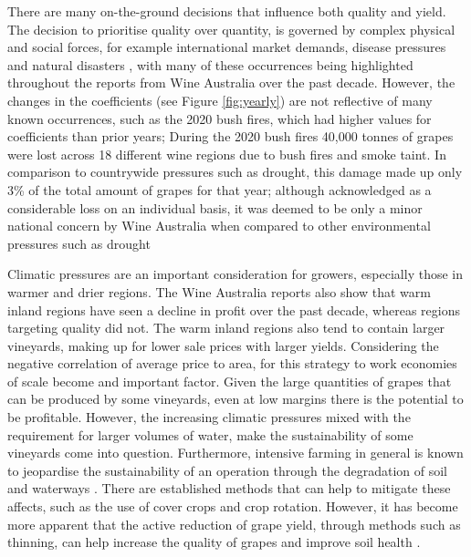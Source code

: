 \documentclass[review,12pt,authoryear]{elsarticle}
\begin{document}
\begin{linenumbers}
There are many on-the-ground decisions that influence both quality and yield. The decision to prioritise quality over quantity, is governed by complex physical and social forces, for example international market demands, disease pressures and natural disasters \citep{abadCoverCropsViticulture2021,cortezUsingDataMining2009,hallWithinseasonTemporalVariation2011,i.goodwinManagingSoilWater2009,kasimatiPredictingGrapeSugar2022,oliverReviewSoilPhysical2013,srivastavaNondestructiveSensingMethods2018}, with many of these occurrences being highlighted throughout the reports from Wine Australia \citep{wineaustraliaNationalVintageReport2019,wineaustraliaNationalVintageReport2021,wineaustraliaNationalVintageReport2022,winemakersfederationofaustraliaNationalVintageReport2013,winemakersfederationofaustraliaNationalVintageReport2014,winemakersfederationofaustraliaNationalVintageReport2015,winemakersfederationofaustraliaNationalVintageReport2016,winemakersfederationofaustraliaNationalVintageReport2017,winemakersfederationofaustraliaNationalVintageReport2018} over the past decade. However, the changes in the coefficients (see Figure \ref{fig:yearly}) are not reflective of many known occurrences, such as the 2020 bush fires, which had higher values for coefficients than prior years; During the 2020 bush fires 40,000 tonnes of grapes were lost across 18 different wine regions due to bush fires and smoke taint. In comparison to countrywide pressures such as drought, this damage made up only 3\% of the total amount of grapes for that year; although acknowledged as a considerable loss on an individual basis, it was deemed to be only a minor national concern by Wine Australia when compared to other environmental pressures such as drought \citep{wineaustraliaNationalVintageReport2020}
\par
Climatic pressures are an important consideration for growers, especially those in warmer and drier regions. The Wine Australia reports also show that warm inland regions have seen a decline in profit over the past decade, whereas regions targeting quality did not. The warm inland regions also tend to contain larger vineyards, making up for lower sale prices with larger yields. Considering the negative correlation of average price to area, for this strategy to work economies of scale become and important factor. Given the large quantities of grapes that can be produced by some vineyards, even at low margins there is the potential to be profitable. However, the increasing climatic pressures mixed with the requirement for larger volumes of water, make the sustainability of some vineyards come into question. Furthermore, intensive farming in general is known to jeopardise the sustainability of an operation through the degradation of soil and waterways \citep{capelloEffectsTractorPasses2019,linHydropedologySynergisticIntegration2012,pisciottaGroundwaterNitrateRisk2015}. There are established methods that can help to mitigate these affects, such as the use of cover crops and crop rotation. However, it has become more apparent that the active reduction of grape yield, through methods such as thinning, can help increase the quality of grapes and improve soil health \citep{condursoEffectsClusterThinning2016,wangChangesGlobalAroma2019}.

\end{linenumbers}
\end{document}
